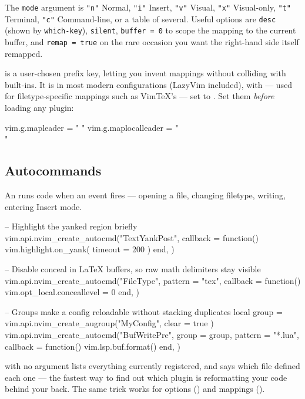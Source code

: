 The \texttt{mode} argument is \texttt{"n"} Normal, \texttt{"i"} Insert,
\texttt{"v"} Visual, \texttt{"x"} Visual-only, \texttt{"t"} Terminal,
\texttt{"c"} Command-line, or a table of several. Useful options are
\texttt{desc} (shown by \texttt{which-key}), \texttt{silent},
\texttt{buffer = 0} to scope the mapping to the current buffer, and
\texttt{remap = true} on the rare occasion you want the right-hand side itself
remapped.

\begin{definition}[Leader]
	 is a user-chosen prefix key, letting you invent mappings without
	colliding with built-ins. It is  in most modern configurations
	(LazyVim included), with  --- used for filetype-specific
	mappings such as VimTeX's --- set to \key{\textbackslash}. Set them
	\emph{before} loading any plugin:
	\begin{luacode}
vim.g.mapleader = " "
vim.g.maplocalleader = "\\"
	\end{luacode}
\end{definition}

\subsection{Autocommands}

An  runs code when an event fires --- opening a file,
changing filetype, writing, entering Insert mode.

\begin{luacode}
-- Highlight the yanked region briefly
vim.api.nvim_create_autocmd("TextYankPost", {
  callback = function()
    vim.highlight.on_yank({ timeout = 200 })
  end,
})

-- Disable conceal in LaTeX buffers, so raw math delimiters stay visible
vim.api.nvim_create_autocmd("FileType", {
  pattern = "tex",
  callback = function()
    vim.opt_local.conceallevel = 0
  end,
})

-- Groups make a config reloadable without stacking duplicates
local group = vim.api.nvim_create_augroup("MyConfig", { clear = true })
vim.api.nvim_create_autocmd("BufWritePre", {
  group = group,
  pattern = "*.lua",
  callback = function() vim.lsp.buf.format() end,
})
\end{luacode}

\begin{note}
	 with no argument lists everything currently registered, and
	 says which file defined each one --- the
	fastest way to find out which plugin is reformatting your code behind your
	back. The same  trick works for options () and mappings ().
\end{note}

